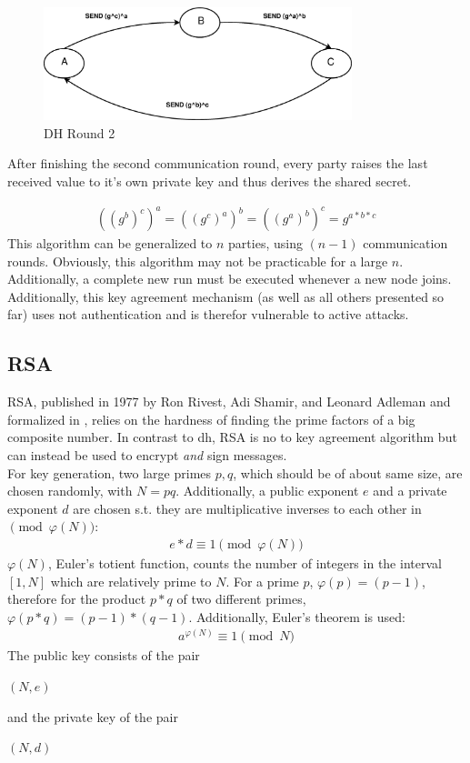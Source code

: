 \begin{figure}
    \centering
    \includegraphics[width=0.8\textwidth]{figures/dh-group_round2.eps}
    \caption{DH Round 2}
    \label{fig:dh2}
\end{figure}
After finishing the second communication round, every party raises the last received value to it's own private key and thus derives the shared secret.

\begin{align}
 ((g^b)^c)^a = ((g^c)^a)^b = ((g^a)^b)^c = g^{a*b*c}
\end{align}
This algorithm can be generalized to $n$ parties, using $(n-1)$ communication rounds. Obviously, this algorithm may not be practicable for a large $n$. Additionally,
a complete new run must be executed whenever a new node joins.
\\
Additionally, this key agreement mechanism (as well as all others presented so far) uses not authentication and is therefor vulnerable to active attacks.

\subsection{RSA}

RSA, published in 1977 by Ron Rivest, Adi Shamir, and Leonard Adleman \cite{RSA} and formalized in \cite{pkcs1},
relies on the hardness of finding the prime factors of a big composite number.
In contrast to \gls{dh}, RSA is no to key agreement algorithm but can instead be used to encrypt \textit{and} sign messages. 
\\
For key generation, 
two large primes $p, q$, which should be of about same size, are chosen randomly, with $N = pq$. Additionally, a public exponent $e$ and a private exponent
$d$ are chosen s.t. they are multiplicative inverses to each other in $\pmod{\varphi(N)}$:
\begin{align}\label{ed}
 e * d \equiv 1 \pmod {\varphi(N)}
\end{align}
$\varphi(N)$, Euler's totient function, counts the number of integers in the interval $[1, N]$ which are relatively prime to $N$.
For a prime $p$, $\varphi(p) = (p-1)$, therefore for the product
$p*q$ of two different primes, $\varphi(p*q) = (p-1) * (q-1)$.
Additionally, Euler's theorem is used:
\begin{align}\label{euler}
a^{\varphi(N)} \equiv 1 \pmod N
\end{align}
The public key consists of the pair
\begin{center}
 $(N, e)$
\end{center}
and the private key of the pair
\begin{center}
 $(N, d)$
\end{center}

